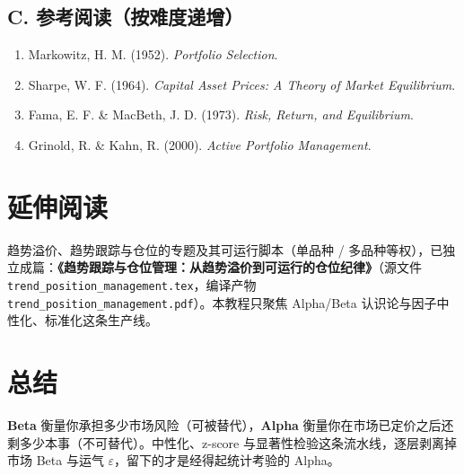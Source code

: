 \documentclass[UTF8,11pt]{ctexart}
\begin{document}
\subsection*{C. 参考阅读（按难度递增）}
\begin{enumerate}[itemsep=2pt]
\item Markowitz, H. M. (1952). \emph{Portfolio Selection}.
\item Sharpe, W. F. (1964). \emph{Capital Asset Prices: A Theory of Market Equilibrium}.
\item Fama, E. F. \& MacBeth, J. D. (1973). \emph{Risk, Return, and Equilibrium}.
\item Grinold, R. \& Kahn, R. (2000). \emph{Active Portfolio Management}.
\end{enumerate}


\section*{延伸阅读}
趋势溢价、趋势跟踪与仓位的专题及其可运行脚本（单品种 / 多品种等权），已独立成篇：\textbf{《趋势跟踪与仓位管理：从趋势溢价到可运行的仓位纪律》}（源文件 \texttt{trend\_position\_management.tex}，编译产物 \texttt{trend\_position\_management.pdf}）。本教程只聚焦 Alpha/Beta 认识论与因子中性化、标准化这条生产线。

\section*{总结}
\textbf{Beta} 衡量你承担多少市场风险（可被替代），\textbf{Alpha} 衡量你在市场已定价之后还剩多少本事（不可替代）。中性化、z-score 与显著性检验这条流水线，逐层剥离掉市场 Beta 与运气 $\varepsilon$，留下的才是经得起统计考验的 Alpha。
\end{document}
